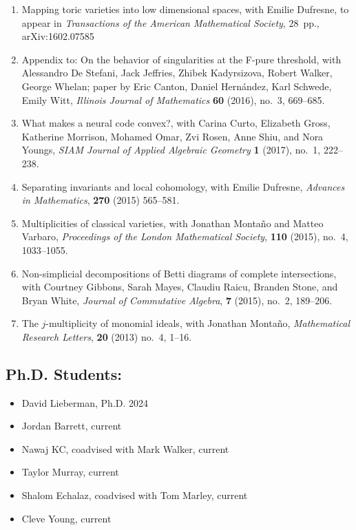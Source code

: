 \documentclass[11pt]{amsart}
\begin{document}
{\begin{enumerate}[leftmargin=9mm]
\item Mapping toric varieties into low dimensional spaces, with Emilie Dufresne, to appear in \emph{Transactions of the American Mathematical Society}, 28~pp., arXiv:1602.07585
\item Appendix to: On the behavior of singularities at the F-pure threshold, with Alessandro De Stefani, Jack Jeffries, Zhibek Kadyrsizova, Robert Walker, George Whelan; paper by Eric Canton, Daniel Hern\'andez, Karl Schwede, Emily Witt, \emph{Illinois Journal of Mathematics} \textbf{60} (2016), no.~3, 669--685.
\item What makes a neural code convex?, with Carina Curto, Elizabeth Gross, Katherine Morrison, Mohamed Omar, Zvi Rosen, Anne Shiu, and Nora Youngs, \emph{SIAM Journal of Applied Algebraic Geometry} \textbf{1} (2017), no.~1, 222--238.
\item Separating invariants and local cohomology, with Emilie Dufresne, \emph{Advances in Mathematics}, \textbf{270} (2015) 565--581.
\item \sloppy Multiplicities of classical varieties, with Jonathan Monta\~no and Matteo Varbaro, \emph{Proceedings of the London Mathematical Society}, {\bf 110} (2015), no.~4, 1033--1055.
\item Non-simplicial decompositions of Betti diagrams of complete intersections, with Courtney Gibbons, Sarah Mayes, Claudiu Raicu, Branden Stone, and Bryan White, \emph{Journal of Commutative Algebra}, \textbf{7} (2015), no.~2, 189--206.
\item The $j$-multiplicity of monomial ideals, with Jonathan Monta\~no, \emph{Mathematical Research Letters}, {\bf 20} (2013) no.~4, 1--16.
\end{enumerate}
}


\subsection*{Ph.D. Students:}
\begin{itemize}[leftmargin=9mm]
	\item David Lieberman, Ph.D. 2024
	\item Jordan Barrett, current
	\item Nawaj KC, coadvised with Mark Walker, current
	\item Taylor Murray, current
	\item Shalom Echalaz, coadvised with Tom Marley, current
	\item Cleve Young, current
	\end{itemize}
\end{document}
